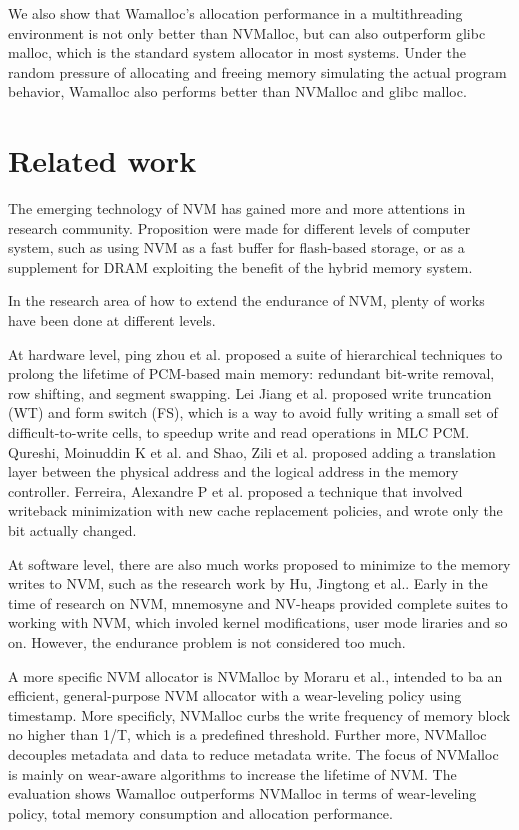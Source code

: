 \documentclass{vldb}
\begin{document}
We also show that Wamalloc's allocation performance in a multithreading environment is not only better than NVMalloc,
but can also outperform glibc malloc, which is the standard system allocator in most systems.
Under the random pressure of allocating and freeing memory simulating the actual program behavior,
Wamalloc also performs better than NVMalloc and glibc malloc.

\section{Related work}

The emerging technology of NVM has gained more and more attentions in research community.
Proposition were made for different levels of computer system, 
such as using NVM as a fast buffer for flash-based storage\cite{greenan2007prims}, 
or as a supplement for DRAM exploiting the benefit of the hybrid memory system.

In the research area of how to extend the endurance of NVM,
plenty of works have been done at different levels.

At hardware level, ping zhou et al.\cite{zhou2009durable} proposed a suite of hierarchical techniques to
prolong the lifetime of PCM-based main memory: 
redundant bit-write removal, row shifting, and segment swapping.
Lei Jiang et al.\cite{jiang2012improving} proposed write truncation (WT) and form switch (FS),
which is a way to avoid fully writing a small set of difficult-to-write cells, to speedup write and read operations in MLC PCM.
Qureshi, Moinuddin K et al.\cite{qureshi2009enhancing} and Shao, Zili et al.\cite{shao2012ptl} proposed adding a translation layer
between the physical address and the logical address in the memory controller.
Ferreira, Alexandre P et al.\cite{ferreira2010increasing} proposed a technique that involved 
writeback minimization with new cache replacement policies, and wrote only the bit actually changed.

At software level, there are also much works proposed to minimize to the memory writes to NVM, 
such as the research work by Hu, Jingtong et al.\cite{hu2013software}.
Early in the time of research on NVM, mnemosyne\cite{volos2011mnemosyne} and NV-heaps\cite{coburn2011nv} provided complete suites to working with NVM, which involed kernel modifications, user mode liraries and so on.
However, the endurance problem is not considered too much.

A more specific NVM allocator is NVMalloc by Moraru et al.\cite{moraru2013consistent},
intended to ba an efficient, general-purpose NVM allocator with a wear-leveling policy using timestamp.
More specificly, NVMalloc curbs the write frequency of memory block no higher than 1/T, which is a predefined threshold.
Further more, NVMalloc decouples metadata and data to reduce metadata write.
The focus of NVMalloc is mainly on wear-aware algorithms to increase the lifetime of NVM.
The evaluation shows Wamalloc outperforms NVMalloc in terms of wear-leveling policy, total memory consumption and allocation performance.
\end{document}
